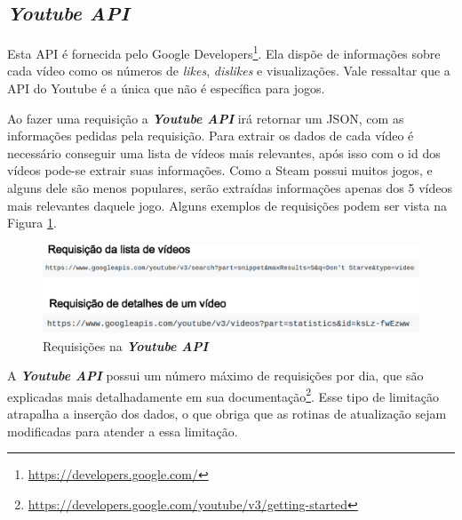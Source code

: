 \subsection*{\textit{Youtube API}}
Esta API é fornecida pelo Google Developers\footnote[6]{\url{https://developers.google.com/}}. Ela dispõe de informações sobre cada vídeo como os números de \textit{likes}, \textit{dislikes} e visualizações. Vale ressaltar que a API do Youtube é a única que não é específica para jogos.

Ao fazer uma requisição a \textit{\textbf{Youtube API}} irá retornar um JSON, com as informações pedidas pela requisição. Para extrair os dados de cada vídeo é necessário conseguir uma lista de vídeos mais relevantes, após isso com o id dos vídeos pode-se extrair suas informações. Como a Steam possui muitos jogos, e alguns dele são menos populares, serão extraídas informações apenas dos 5 vídeos mais relevantes daquele jogo. Alguns exemplos de requisições podem ser vista na Figura \ref{image:requiYou}.
\begin{figure} [H]
\centering
\includegraphics[scale=0.5]{figuras/requisicaoYou.eps}
\caption{Requisições na \textit{\textbf{Youtube API}}}
\label{image:requiYou}
\end{figure}

A \textit{\textbf{Youtube API}} possui um número máximo de requisições por dia, que são explicadas mais detalhadamente em sua documentação\footnote[7]{\url{https://developers.google.com/youtube/v3/getting-started}}. Esse tipo de limitação atrapalha a inserção dos dados, o que obriga que as rotinas de atualização sejam modificadas para atender a essa limitação.


